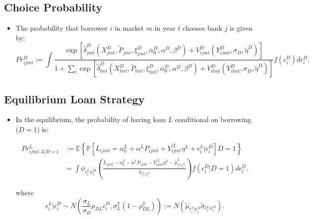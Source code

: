 \documentclass[]{book}
\providecommand{\tightlist}{%
  \setlength{\itemsep}{0pt}\setlength{\parskip}{0pt}}
\begin{document}
\subsection{Choice Probability}\label{choice-probability}

\begin{itemize}
\tightlist
\item
  The probability that borrower \(i\) in market \(m\) in year \(t\)
  chooses bank \(j\) is given by: \[
  Pr_{ijmt}^D := \int \frac{\exp[\tilde{\delta}_{jmt}^D(X_{jmt}^D, \widetilde{P}_{jmt}, \xi_{jmt}^D, \overline{\alpha}_0^D, \alpha^D, \beta^D) + V_{ijmt}^D(Y_{ijmt}^D, \sigma_D, \tilde{\eta}^D)]}{1 + \sum_{l} \exp[\tilde{\delta}_{lmt}^D(X_{lmt}^D, \widetilde{P}_{lmt}, \xi_{lmt}^D, \overline{\alpha}_0^D, \alpha^D, \beta^D) + V_{ilmt}^D(Y_{ilmt}^D, \sigma_D, \tilde{\eta}^D)]} f(\epsilon_i^D) d\epsilon_i^D.
  \]
\end{itemize}

\subsection{Equilibrium Loan Strategy}\label{equilibrium-loan-strategy}

\begin{itemize}
\tightlist
\item
  In the equilibrium, the probability of having loan \(L\) conditional
  on borrowing (\(D = 1\)) is:

  \begin{equation}
  \begin{split}
  Pr_{ijmt, L|D = 1}^L &:= \mathbb{E}\left\{\mathbb{P}[L_{ijmt} = \alpha_0^L + \alpha^L P_{ijmt} + Y_{ijmt}^{\prime L} \eta^L + \epsilon_i^L|\epsilon_i^D] D = 1 \right\}\\
  &= \int \phi_{\epsilon_i^L|\epsilon_i^D} \left(\frac{L_{ijmt} - \alpha_0^L - \alpha^L P_{ijmt} - Y_{ijmt}^{\prime L} \eta^L - \tilde{\mu}_{\epsilon_i^L|\epsilon_i^D}^L}{\tilde{\sigma}_{\epsilon_i^L|\epsilon_i^D}} \right) f(\epsilon_i^D|D = 1) d \epsilon_i^D.
  \end{split} \label{eq:loan-strategy}
  \end{equation}

  where \[
  \epsilon_i^L | \epsilon_i^D \sim N\left(\frac{\sigma_L}{\sigma_D} \rho_{DL} \epsilon_i^D, \sigma_L^2 (1 - \rho_{DL}^2) \right) := N(\tilde{\mu}_{\epsilon_i^L|\epsilon_i^D}^, \tilde{\sigma}_{\epsilon_i^L|\epsilon_i^D}).
  \]
\end{itemize}
\end{document}
